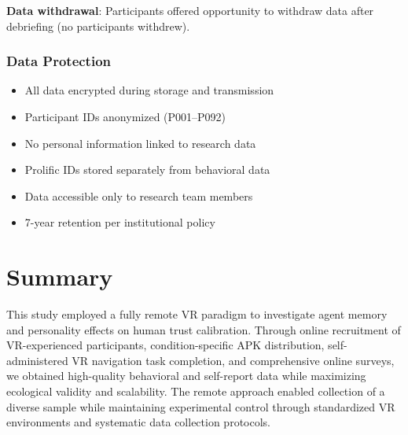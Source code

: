 \documentclass[12pt]{article}
\begin{document}
\textbf{Data withdrawal}: Participants offered opportunity to withdraw data after debriefing (no participants withdrew).

\subsubsection{Data Protection}

\begin{itemize}
    \item All data encrypted during storage and transmission
    \item Participant IDs anonymized (P001--P092)
    \item No personal information linked to research data
    \item Prolific IDs stored separately from behavioral data
    \item Data accessible only to research team members
    \item 7-year retention per institutional policy
\end{itemize}

\section{Summary}

This study employed a fully remote VR paradigm to investigate agent memory and personality effects on human trust calibration. Through online recruitment of VR-experienced participants, condition-specific APK distribution, self-administered VR navigation task completion, and comprehensive online surveys, we obtained high-quality behavioral and self-report data while maximizing ecological validity and scalability. The remote approach enabled collection of a diverse sample while maintaining experimental control through standardized VR environments and systematic data collection protocols.



\end{document}
